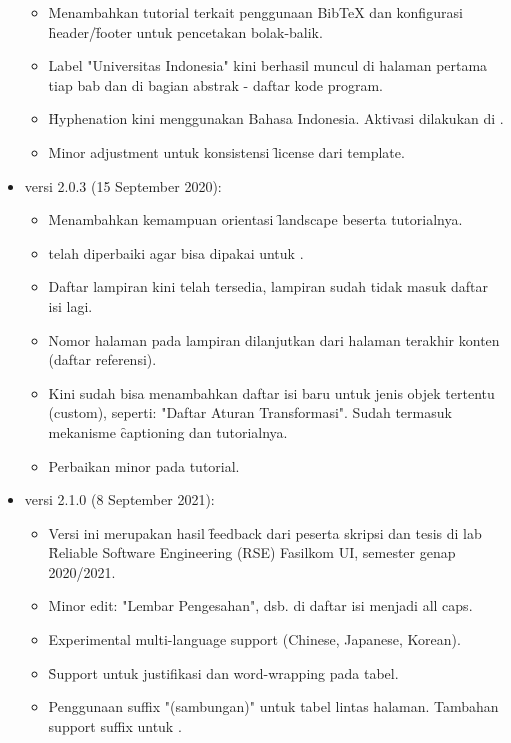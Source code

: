 \begin{itemize}
\begin{itemize}
			\item Menambahkan tutorial terkait penggunaan BibTeX dan konfigurasi \f{header}/\f{footer} untuk pencetakan bolak-balik.
			\item Label "Universitas Indonesia" kini berhasil muncul di halaman pertama tiap bab dan di bagian abstrak - daftar kode program.
			\item \f{Hyphenation} kini menggunakan  Bahasa Indonesia. Aktivasi dilakukan di .
			\item Minor adjustment untuk konsistensi \f{license} dari template.
		\end{itemize}
	\item versi 2.0.3 (15 September 2020):
		\begin{itemize}
			\item Menambahkan kemampuan orientasi \f{landscape} beserta tutorialnya.
			\item {} telah diperbaiki agar bisa dipakai untuk .
			\item Daftar lampiran kini telah tersedia, lampiran sudah tidak masuk daftar isi lagi.
			\item Nomor halaman pada lampiran dilanjutkan dari halaman terakhir konten (daftar referensi).
			\item Kini sudah bisa menambahkan daftar isi baru untuk jenis objek tertentu (custom), seperti: "Daftar Aturan Transformasi".
			Sudah termasuk mekanisme \f{captioning} dan tutorialnya.
			\item Perbaikan minor pada tutorial.
		\end{itemize}
	\item versi 2.1.0 (8 September 2021):
		\begin{itemize}
			\item Versi ini merupakan hasil \f{feedback} dari peserta skripsi dan tesis di lab \f{Reliable Software Engineering} (RSE) Fasilkom UI, semester genap 2020/2021.
			\item Minor edit: "Lembar Pengesahan", dsb. di daftar isi menjadi all caps.
			\item Experimental multi-language support (Chinese, Japanese, Korean).
			\item \f{Support} untuk justifikasi dan word-wrapping pada tabel.
			\item Penggunaan suffix "(sambungan)" untuk tabel lintas halaman. Tambahan support suffix untuk .
		\end{itemize}

\end{itemize}
